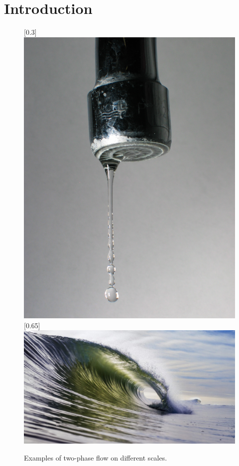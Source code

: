 \chapter{Introduction}\label{ch:intro}
\begin{figure}
  [0.3\textwidth]{
    \includegraphics[scale=0.16]{png/Dripping_faucet_2.jpg}
  }\hfill
  [0.65\textwidth]{
    \includegraphics[scale=0.35]{png/shutterstock_509860879-breaking-wave-3720x2000-1024x551.jpg}
  }
  \caption{Examples of two-phase flow on different scales.}
\end{figure}
\lipsum[1-3]